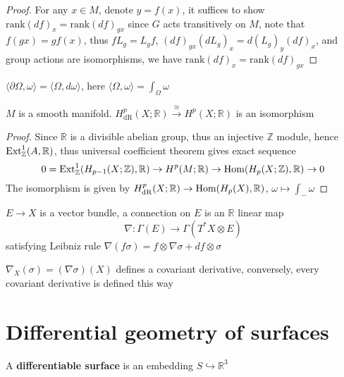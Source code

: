 \documentclass[main]{subfiles}
\begin{document}
\begin{proof}
For any $x\in M$, denote $y=f(x)$, it suffices to show $\mathrm{rank}(df)_x=\mathrm{rank}(df)_{gx}$ since $G$ acts transitively on $M$, note that $f(gx)=gf(x)$, thus $fL_g=L_{g}f$, $(df)_{gx}(dL_g)_x=d(L_g)_y(df)_x$, and group actions are isomorphisms, we have $\mathrm{rank}(df)_x=\mathrm{rank}(df)_{gx}$
\end{proof}

\begin{theorem}\label{Stokes' theorem}
$\langle\partial\Omega,\omega\rangle=\langle\Omega,d\omega\rangle$, here $\langle\Omega,\omega\rangle=\displaystyle\int_\Omega\omega$
\end{theorem}

\begin{theorem}
$M$ is a smooth manifold. $H_{\mathrm{dR}}^p(X;\mathbb R)\xrightarrow{\cong} H^p(X;\mathbb R)$ is an isomorphism
\end{theorem}

\begin{proof}
Since $\mathbb R$ is a divisible abelian group, thus an injective $\mathbb Z$ module, hence $\operatorname{Ext}^1_{\mathbb Z}(A,\mathbb R)$, thus universal coefficient theorem gives exact sequence
\[0=\operatorname{Ext}^1_{\mathbb Z}(H_{p-1}(X;\mathbb Z),\mathbb R)\to H^p(M;\mathbb R)\to \operatorname{Hom}(H_p(X;\mathbb Z),\mathbb R)\to0\]
The isomorphism is given by $H_{\mathrm{dR}}^p(X;\mathbb R)\to \operatorname{Hom}(H_p(X),\mathbb R)$, $\omega\mapsto\displaystyle\int_{-}\omega$
\end{proof}

\begin{definition}
$E\to X$ is a vector bundle, a connection on $E$ is an $\mathbb R$ linear map
\[\nabla:\Gamma(E)\to\Gamma(T^*X\otimes E)\]
satisfying Leibniz rule $\nabla(f\sigma)=f\otimes\nabla\sigma+df\otimes\sigma$
\end{definition}

\begin{lemma}
$\nabla_X(\sigma)=(\nabla\sigma)(X)$ defines a covariant derivative, conversely, every covariant derivative is defined this way
\end{lemma}



\section{Differential geometry of surfaces}

\begin{definition}
A \textbf{differentiable surface} is an embedding $S\hookrightarrow\mathbb R^3$
\end{definition}
\end{document}
